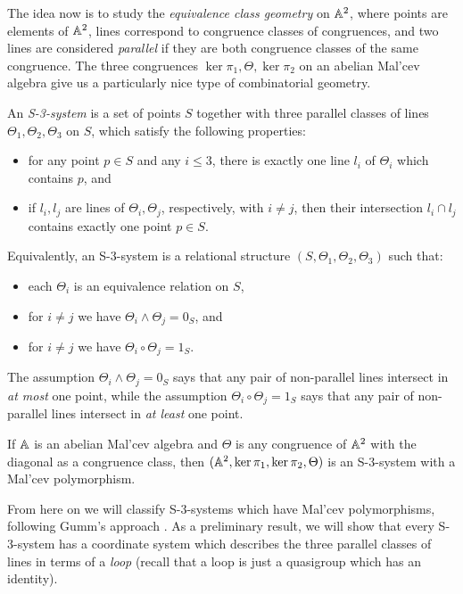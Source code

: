 \documentclass[letterpaper,11pt]{article}
\begin{document}

The idea now is to study the \emph{equivalence class geometry} on $\mathbb{A}^2$, where points are elements of $\mathbb{A}^2$, lines correspond to congruence classes of congruences, and two lines are considered \emph{parallel} if they are both congruence classes of the same congruence. The three congruences $\ker \pi_1, \Theta, \ker \pi_2$ on an abelian Mal'cev algebra give us a particularly nice type of combinatorial geometry.

\begin{defn} An \emph{S-3-system} is a set of points $S$ together with three parallel classes of lines $\Theta_1, \Theta_2, \Theta_3$ on $S$, which satisfy the following properties:
\begin{itemize}
\item for any point $p \in S$ and any $i \le 3$, there is exactly one line $l_i$ of $\Theta_i$ which contains $p$, and

\item if $l_i, l_j$ are lines of $\Theta_i, \Theta_j$, respectively, with $i \ne j$, then their intersection $l_i \cap l_j$ contains exactly one point $p \in S$.
\end{itemize}
Equivalently, an S-3-system is a relational structure $(S,\Theta_1,\Theta_2,\Theta_3)$ such that:
\begin{itemize}
\item each $\Theta_i$ is an equivalence relation on $S$,

\item for $i \ne j$ we have $\Theta_i \wedge \Theta_j = 0_S$, and

\item for $i \ne j$ we have $\Theta_i \circ \Theta_j = 1_S$.
\end{itemize}
The assumption $\Theta_i \wedge \Theta_j = 0_S$ says that any pair of non-parallel lines intersect in \emph{at most} one point, while the assumption $\Theta_i \circ \Theta_j = 1_S$ says that any pair of non-parallel lines intersect in \emph{at least} one point.
\end{defn}

\begin{cor} If $\mathbb{A}$ is an abelian Mal'cev algebra and $\Theta$ is any congruence of $\mathbb{A}^2$ with the diagonal as a congruence class, then $(\mathbb{A}^2, \ker \pi_1, \ker \pi_2, \Theta)$ is an S-3-system with a Mal'cev polymorphism.
\end{cor}

From here on we will classify S-3-systems which have Mal'cev polymorphisms, following Gumm's approach \cite{abelian-malcev-affine}. As a preliminary result, we will show that every S-3-system has a coordinate system which describes the three parallel classes of lines in terms of a \emph{loop} (recall that a loop is just a quasigroup which has an identity).
\end{document}
